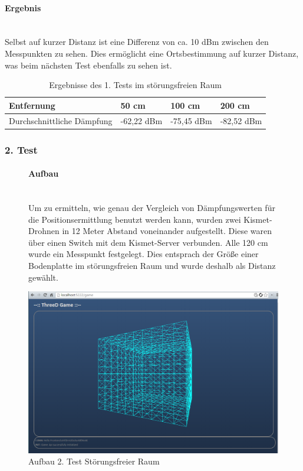 \documentclass[a4paper]{spie}  %
\begin{document}
\paragraph{Ergebnis}\mbox{}\\
Selbst auf kurzer Distanz ist eine Differenz von ca. 10 dBm zwischen den Messpunkten zu sehen. Dies ermöglicht eine Ortsbestimmung auf kurzer Distanz, was beim nächsten Test ebenfalls zu sehen ist.

\begin{table}[H]
\centering
	\begin{tabular}{ | p{2.5cm} | l | l | l | }
		\hline 
		Entfernung	& 50 cm	& 100 cm	& 200 cm	\\ \hline
		Durchschnittliche Dämpfung & -62,22 dBm	& -75,45 dBm	& -82,52 dBm \\
		\hline
	\end{tabular}
	\caption{Ergebnisse des 1. Tests im störungsfreien Raum}
	\label{tab:probeTab}
\end{table}

\subsubsection{2. Test}\label{testNr2}

\begin{figure}[H]
\begin{minipage}[t]{0.4\textwidth}
\vspace{0pt}
\paragraph{Aufbau}\mbox{}\\
Um zu ermitteln, wie genau der Vergleich von Dämpfungswerten für die Positionsermittlung benutzt werden kann, wurden zwei Kismet-Drohnen in 12 Meter Abstand voneinander aufgestellt. Diese waren über einen Switch mit dem Kismet-Server verbunden. Alle 120 cm wurde ein Messpunkt festgelegt. Dies entsprach der Größe einer Bodenplatte im störungsfreien Raum und wurde deshalb als Distanz gewählt.
\end{minipage}
\hfill
\begin{minipage}[t]{0.5\textwidth}
\vspace{0pt}
		\includegraphics[width=\textwidth]{./images/FrontendInit.png}
		\caption{Aufbau 2. Test Störungsfreier Raum}
		\label{fig:test2}
\end{minipage}
\end{figure}
\end{document}
